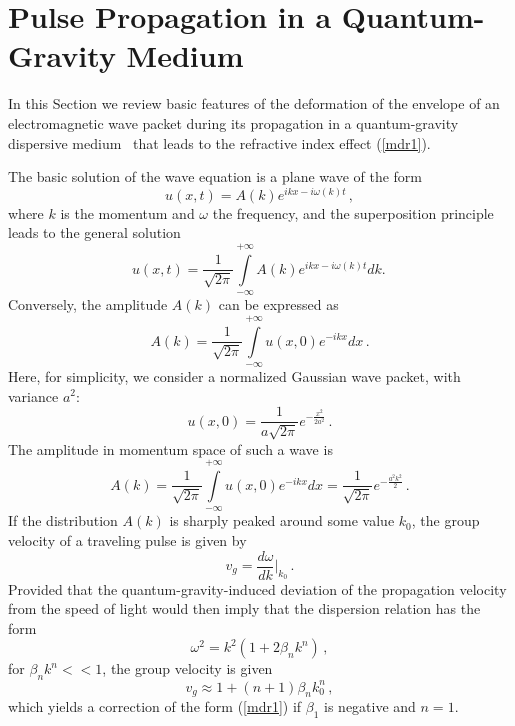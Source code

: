 \documentclass[12pt]{article}
\newcommand{\beq}{\begin{equation}}
\newcommand{\eeq}{\end{equation}}
\newcommand{\intinf}{\int\limits_{-\infty}^{+\infty}}
\begin{document}
\section{Pulse Propagation in a Quantum-Gravity Medium}
\label{secPulse}

In this Section we review basic features of the deformation of the envelope of an electromagnetic wave packet during its
propagation in a quantum-gravity dispersive medium~\cite{mitsou} that leads to the refractive index effect (\ref{mdr1}).

The basic solution of the wave equation is a plane wave of the form
\beq
u(x,t) = A(k)e^{ikx-i\omega (k)t} \, ,
\eeq
where $k$ is the momentum and $\omega$ the frequency, and the superposition principle leads to the general solution
\beq
u(x,t) = \frac{1}{\sqrt{2\pi}}\intinf A(k)e^{ikx-i\omega (k)t}dk. \,
\eeq
Conversely, the amplitude $A(k)$ can be expressed as
\beq
A(k) = \frac{1}{\sqrt{2\pi}}\intinf u(x,0)e^{-ikx}dx \, .
\eeq
Here, for simplicity, we consider a normalized Gaussian wave packet, with variance $a^2$:
\beq
u(x,0) = \frac{1}{a\sqrt{2\pi}} e^{-\frac{x^2}{2a^2}} \, .
\label{gaussPack0}
\eeq
The amplitude in momentum space of such a wave is
\beq
\label{amplGauss1}
A(k)=\frac{1}{\sqrt{2\pi}}\intinf u(x,0)e^{-ikx}dx = \frac{1}{\sqrt{2\pi}}e^{-\frac{a^2k^2}{2}} \, .
\eeq
If the distribution $A(k)$ is sharply peaked around some value $k_0$, the group velocity of a traveling pulse is given by
\beq
v_g=\frac{d\omega}{dk}\vert_{k_0} \, .
\label{vGr}
\eeq
Provided that the quantum-gravity-induced deviation of the propagation velocity from the speed of light would then imply
that the dispersion relation has the form
\beq
\omega^2=k^2(1+2\beta_n k^n) \, ,
\label{dispRel1}
\eeq
for $\beta_n k^n<<1$, the group velocity is given
\beq
v_g \approx 1+(n+1)\beta_n k_0^n \, ,
\label{vg}
\eeq
which yields a correction of the form (\ref{mdr1}) if $\beta_1$ is negative and $n = 1$.
\end{document}
